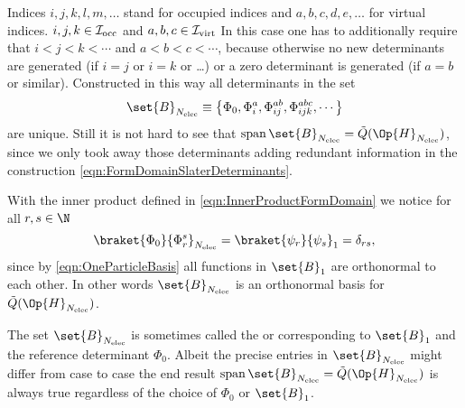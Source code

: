\begin{rem}
{		Indices $i,j,k,l,m, \ldots$ stand for occupied indices
		and $a,b,c,d,e, \ldots$ for virtual indices.
	} $i,j,k \in \mathcal{I}_\text{occ}$ and $a,b,c \in \mathcal{I}_\text{virt}$
	In this case one has to additionally
	require that $i < j < k < \cdots$ and $a < b < c < \cdots$,
	because otherwise no new determinants are generated (if $i=j$ or $i=k$ or \ldots)
	or a zero determinant is generated (if $a=b$ or similar).
	Constructed in this way all determinants in the set
	\[
		\set{B}_{\Nelec} \equiv
		\left\{
			\Phi_0, \Phi_i^a, \Phi_{ij}^{ab}, \Phi_{ijk}^{abc}, \cdots \right\}
	\]
	are unique.
	Still it is not hard to see
	that $\spacespan \set{B}_{\Nelec} = \tilde{Q}(\Op{H}_{\Nelec})$,
	since we only took away those determinants adding redundant information
	in the construction \eqref{eqn:FormDomainSlaterDeterminants}.

	With the inner product defined in \eqref{eqn:InnerProductFormDomain} we notice
	for all $r,s \in \N$
	\[
		\braket{\Phi_0}{\Phi_r^s}_{\Nelec}
			= \braket{\psi_r}{\psi_s}_1 = \delta_{rs},
	\]
	since by \eqref{eqn:OneParticleBasis}
	all functions in $\set{B}_1$ are orthonormal to each other.
	In other words $\set{B}_{\Nelec}$ is an orthonormal
	basis for $\tilde{Q}(\Op{H}_{\Nelec})$.
\end{rem}
The set $\set{B}_{\Nelec}$ is sometimes called the 
or 
corresponding to $\set{B}_1$ and the reference determinant $\Phi_0$.
Albeit the precise entries in $\set{B}_{\Nelec}$ might differ from case to case
the end result $\spacespan \set{B}_{\Nelec} = \tilde{Q}(\Op{H}_{\Nelec})$
is always true
regardless of the choice of $\Phi_0$ or $\set{B}_1$.

